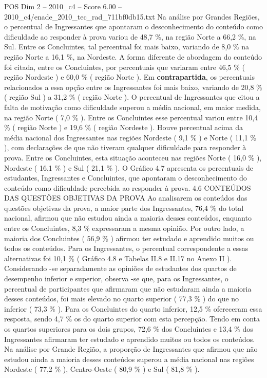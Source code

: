 \begin{textsample}{POS Dim 2 – 2010\_c4 – Score 6.00 – 2010\_c4/enade\_2010\_tec\_rad\_711bf0db15.txt}
Na análise por Grandes Regiões, o percentual de Ingressantes que apontaram o desconhecimento do conteúdo como dificuldade ao responder à prova variou de 48,7 \%, na região Norte a 66,2 \%, na Sul.
Entre os Concluintes, tal percentual foi mais baixo, variando de 8,0 \% na região Norte a 16,1 \%, na Nordeste.
A forma diferente de abordagem do conteúdo foi citada, entre os Concluintes, por percentuais que variaram entre 46,5 \% ( região Nordeste ) e 60,0 \% ( região Norte ).
Em \textbf{contrapartida}, os percentuais relacionados a essa opção entre os Ingressantes foi mais baixo, variando de 20,8 \% ( região Sul ) a 31,2 \% ( região Norte ).
O percentual de Ingressantes que citou a falta de motivação como dificuldade superou a média nacional, em maior medida, na região Norte ( 7,0 \% ).
Entre os Concluintes esse percentual variou entre 10,4 \% ( região Norte ) e 19,6 \% ( região Nordeste ).
Houve percentual acima da média nacional dos Ingressantes nas regiões Nordeste ( 9,1 \% ) e Norte ( 11,1 \% ), com declarações de que não tiveram qualquer dificuldade para responder à prova.
Entre os Concluintes, esta situação aconteceu nas regiões Norte ( 16,0 \% ), Nordeste ( 16,1 \% ) e Sul ( 21,1 \% ).
O Gráfico 4.7 apresenta os percentuais de estudantes, Ingressantes e Concluintes, que apontaram o desconhecimento do conteúdo como dificuldade percebida ao responder à prova. 4.6 CONTEÚDOS DAS QUESTÕES OBJETIVAS DA PROVA Ao analisarem os conteúdos das questões objetivas da prova, a maior parte dos Ingressantes, 76,4 \% do total nacional, afirmou que não estudou ainda a maioria desses conteúdos, enquanto entre os Concluintes, 8,3 \% expressaram a mesma opinião.
Por outro lado, a maioria dos Concluintes ( 56,9 \% ) afirmou ter estudado e aprendido muitos ou todos os conteúdos.
Para os Ingressantes, o percentual correspondente a essas alternativas foi 10,1 \% ( Gráfico 4.8 e Tabelas II.8 e II.17 no Anexo II ).
Considerando -se separadamente as opiniões de estudantes dos quartos de desempenho inferior e superior, observa -se que, para os Ingressantes, o percentual de participantes que afirmaram que não estudaram ainda a maioria desses conteúdos, foi mais elevado no quarto superior ( 77,3 \% ) do que no inferior ( 73,3 \% ).
Para os Concluintes do quarto inferior, 12,5 \% ofereceram essa resposta, sendo 4,7 \% os do quarto superior com esta percepção.
Tendo em conta os quartos superiores para os dois grupos, 72,6 \% dos Concluintes e 13,4 \% dos Ingressantes afirmaram ter estudado e aprendido muitos ou todos os conteúdos.
Na análise por Grande Região, a proporção de Ingressantes que afirmou que não estudou ainda a maioria desses conteúdos superou a média nacional nas regiões Nordeste ( 77,2 \% ), Centro-Oeste ( 80,9 \% ) e Sul ( 81,8 \% ).

\end{textsample}
